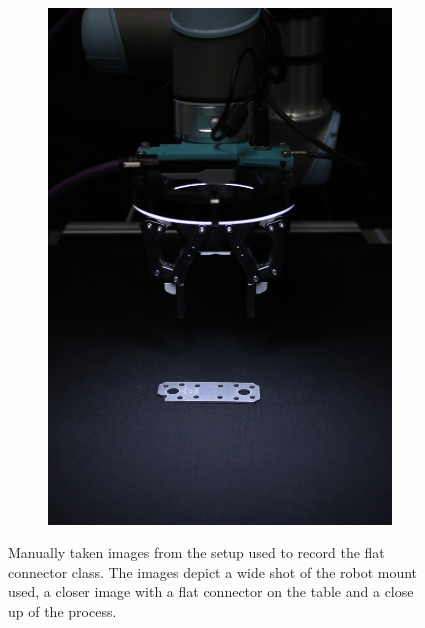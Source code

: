\begin{figure}[htbp]
\begin{subfigure}[b]{0.3\textwidth}
    \end{subfigure}
    \begin{subfigure}[b]{0.3\textwidth}
        \centering
        \includegraphics[angle=90, width=\textwidth]{figures/setupimages/setup_close.JPG}


    \end{subfigure}
    \caption{Manually taken images from the setup used to record the flat connector class. The images depict a wide shot of the robot mount used, 
             a closer image with a flat connector on the table and a close up of the process.}
    \label{fig:setupofdatacollection}
\end{figure}

